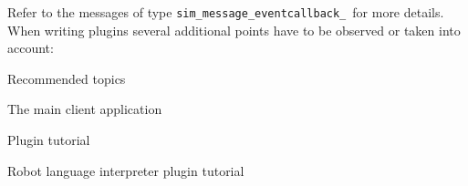 Refer to the messages of type \verb|sim_message_eventcallback_|\ for more 
details. When writing plugins several additional points have to be observed 
or taken into account:









Recommended topics

The main client application

Plugin tutorial

Robot language interpreter plugin tutorial


